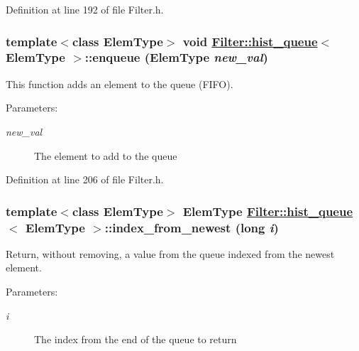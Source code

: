 Definition at line 192 of file Filter.h.\hypertarget{classFilter_1_1hist__queue_a3}{
\subsubsection[enqueue]{\setlength{\rightskip}{0pt plus 5cm}template$<$class Elem\-Type$>$ void \hyperlink{classFilter_1_1hist__queue}{Filter::hist\_\-queue}$<$ Elem\-Type $>$::enqueue (Elem\-Type {\em new\_\-val})}}
\label{classFilter_1_1hist__queue_a3}


This function adds an element to the queue (FIFO).

\begin{Desc}
\item[Parameters:]
\begin{description}
\item[{\em new\_\-val}]The element to add to the queue \end{description}
\end{Desc}


Definition at line 206 of file Filter.h.\hypertarget{classFilter_1_1hist__queue_a5}{
\subsubsection[index\_\-from\_\-newest]{\setlength{\rightskip}{0pt plus 5cm}template$<$class Elem\-Type$>$ Elem\-Type \hyperlink{classFilter_1_1hist__queue}{Filter::hist\_\-queue}$<$ Elem\-Type $>$::index\_\-from\_\-newest (long {\em i})}}
\label{classFilter_1_1hist__queue_a5}


Return, without removing, a value from the queue indexed from the newest element.

\begin{Desc}
\item[Parameters:]
\begin{description}
\item[{\em i}]The index from the end of the queue to return \end{description}
\end{Desc}


